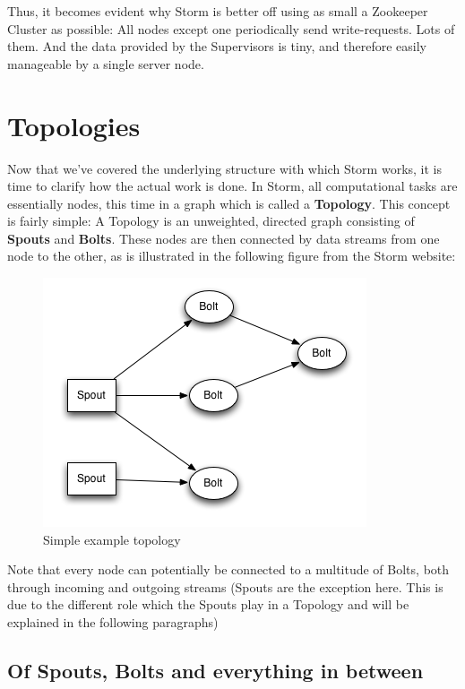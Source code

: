 \documentclass[12pt,a4paper]{article}
\begin{document}
Thus, it becomes evident why Storm is better off using as small a Zookeeper Cluster as possible: All nodes except one periodically send write-requests. Lots of them. And the data provided by the Supervisors is tiny, and therefore easily manageable by a single server node.

\section{Topologies}

Now that we've covered the underlying structure with which Storm works, it is time to clarify how the actual work is done. In Storm, all computational tasks are essentially nodes, this time in a graph which is called a \textbf{Topology}. This concept is fairly simple: A Topology is an unweighted, directed graph consisting of \textbf{Spouts} and \textbf{Bolts}. These nodes are then connected by data streams from one node to the other, as is illustrated in the following figure from the Storm website:\\
\begin{figure}[H]
\begin{center}
\includegraphics[scale=0.7]{images/topology.png}
\end{center}
\caption{Simple example topology}
\end{figure}
Note that every node can potentially be connected to a multitude of Bolts, both through incoming and outgoing streams (Spouts are the exception here. This is due to the different role which the Spouts play in a Topology and will be explained in the following paragraphs)

\subsection{Of Spouts, Bolts and everything in between}
\end{document}
